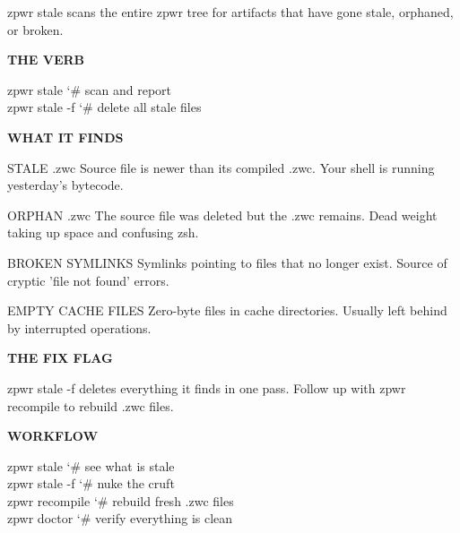\documentclass[11pt,a4paper,twoside]{book}
\begin{document}
zpwr stale scans the entire zpwr tree for artifacts that have gone stale, orphaned, or broken.


\vspace{12pt}
{\bfseries\color{neonyellow} THE VERB}\vspace{4pt}

\begin{codebox}
\color{neongreen}zpwr stale                 {\char`\#} scan and report\\
\color{neongreen}zpwr stale -f              {\char`\#} delete all stale files\\
\end{codebox}


\vspace{12pt}
{\bfseries\color{neonyellow} WHAT IT FINDS}\vspace{4pt}

STALE .zwc Source file is newer than its compiled .zwc. Your shell is running yesterday's bytecode.

ORPHAN .zwc The source file was deleted but the .zwc remains. Dead weight taking up space and confusing zsh.

BROKEN SYMLINKS Symlinks pointing to files that no longer exist. Source of cryptic 'file not found' errors.

EMPTY CACHE FILES Zero-byte files in cache directories. Usually left behind by interrupted operations.


\vspace{12pt}
{\bfseries\color{neonyellow} THE FIX FLAG}\vspace{4pt}

zpwr stale -f deletes everything it finds in one pass. Follow up with zpwr recompile to rebuild .zwc files.


\vspace{12pt}
{\bfseries\color{neonyellow} WORKFLOW}\vspace{4pt}

\begin{codebox}
\color{neongreen}zpwr stale                 {\char`\#} see what is stale\\
\color{neongreen}zpwr stale -f              {\char`\#} nuke the cruft\\
\color{neongreen}zpwr recompile             {\char`\#} rebuild fresh .zwc files\\
\color{neongreen}zpwr doctor                {\char`\#} verify everything is clean\\
\end{codebox}
\end{document}
